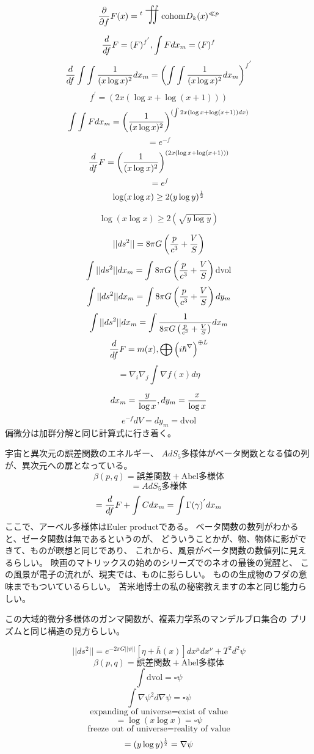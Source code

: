 \documentclass{jsarticle}
\begin{document}
 $$ {\partial \over \partial f}F(x) = {{}^t \scalebox{1}[2]{\variint}} 
 \text{cohom}D_k(x)^{\ll p} $$

 $$ {d \over df}F = (F)^{f^{'}}, \int F dx_m = (F)^{f}  $$
 $$ {d \over df}\int \int{1 \over (x \log x)^2}dx_m =
 \left(\int \int{1 \over (x \log x)^2}dx_m \right)^{f^{'}}  $$
 $$ f^{'} = (2x (\log x + \log (x + 1))) $$
  $$  \int \int F dx_m = \left({1 \over (x \log x)^2}\right)^{
	  (\int 2x (\log x + \log (x + 1))dx)} $$ 
   $$= e^{-f} $$
  $$ {d \over df}F = \left({1 \over (x \log x)^2}\right)^{
	  (2x (\log x + \log (x + 1))) } $$  
  $$= e^{f} $$
  $$ \log (x \log x) \ge 2(y \log y)^{1 \over 2} $$

  $$ \log (x \log x) \ge 2(\sqrt{y \log y}) $$

 
    $$ ||ds^2|| = 8 \pi G \left({p \over c^3} + {V \over S}\right) $$
    $$ \int ||ds^2||dx_m  = \int 8 \pi G \left({p \over c^3} 
    + {V \over S}\right)\mathrm{dvol}  $$
    $$ \int ||ds^2||dx_m  = \int 8 \pi G \left({p \over c^3} 
    + {V \over S}\right)dy_m $$
     $$ \int ||ds^2||dx_m  = \int {1 \over {8 \pi G \left({p \over c^3} 
    + {V \over S}\right)}}dx_m $$
    $$ {d \over df}F = m(x), \bigoplus \left({i \hbar}^{\nabla}\right)^{
	    \oplus L} $$
    $$ = \nabla_{i} \nabla_{j} \int \nabla f(x)d \eta $$

    $$ dx_m = {y \over {\log x}}, dy_m = {x \over \log x} $$
    $$ e^{-f}dV = dy_m = \mathrm{dvol} $$
    偏微分は加群分解と同じ計算式に行き着く。

   宇宙と異次元の誤差関数のエネルギー、
    $AdS_5$多様体がベータ関数となる値の列が、異次元への扉となっている。
    $$ \beta(p,q) = \text{誤差関数} + \text{Abel多様体} $$
    $$ = \text{$AdS_5$多様体} $$
    $$ = {d \over df}F + \int C dx_m = \int \Gamma(\gamma)^{'}dx_m $$
    ここで、アーベル多様体はEuler productである。
    ベータ関数の数列がわかると、ゼータ関数は無であるというのが、
    どういうことかが、物、物体に影ができて、ものが瞑想と同じであり、
    これから、風景がベータ関数の数値列に見えるらしい。
    映画のマトリックスの始めのシリーズでのネオの最後の覚醒と、
    この風景が電子の流れが、現実では、ものに影らしい。
    ものの生成物のフダの意味までもついているらしい。
    苫米地博士の私の秘密教えますの本と同じ能力らしい。

    この大域的微分多様体のガンマ関数が、複素力学系のマンデルブロ集合の
    プリズムと同じ構造の見方らしい。

    $$ ||ds^2|| = e^{-2\pi G ||\psi||}[\eta + \bar{h}(x)]dx^{\mu}dx^{\nu}
    + T^2 d^2 \psi $$
    $$ \beta(p,q) = \text{誤差関数} + \text{Abel多様体} $$
    $$ \int \mathrm{dvol} = \square \psi $$
    $$ \int \nabla \psi^2 d \nabla \psi = \square \psi $$
    $$ \text{expanding of universe} = \text{exist of value} $$
    $$ = \log (x \log x) = \square \psi $$
    $$ \text{freeze out of universe} = \text{reality of value} $$
    $$ = (y \log y)^{1 \over 2} = \nabla \psi $$
\end{document}
